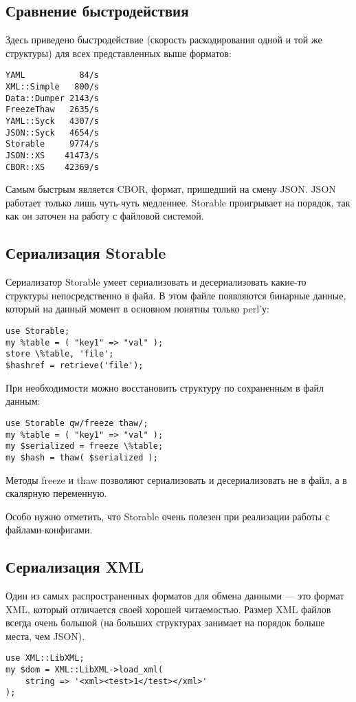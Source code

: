\subsection{Сравнение быстродействия}
Здесь приведено быстродействие (скорость раскодирования одной и той же структуры) для всех представленных выше форматов:
\begin{verbatim}
YAML           84/s
XML::Simple   800/s
Data::Dumper 2143/s
FreezeThaw   2635/s
YAML::Syck   4307/s
JSON::Syck   4654/s
Storable     9774/s
JSON::XS    41473/s
CBOR::XS    42369/s
\end{verbatim}
Самым быстрым является CBOR, формат, пришедший на смену JSON. JSON работает только лишь чуть-чуть медленнее. Storable проигрывает на порядок, так как он заточен на работу с файловой системой.

\subsection{Сериализация Storable}
Сериализатор Storable умеет сериализовать и десериализовать какие-то структуры непосредственно в файл. В этом файле появляются бинарные данные, который на данный момент в основном понятны только perl'у:
\begin{verbatim}
use Storable;
my %table = ( "key1" => "val" );
store \%table, 'file';
$hashref = retrieve('file');
\end{verbatim}
При необходимости можно восстановить структуру по сохраненным в файл данным:
\begin{verbatim}
use Storable qw/freeze thaw/;
my %table = ( "key1" => "val" );
my $serialized = freeze \%table;
my $hash = thaw( $serialized );
\end{verbatim}
Методы freeze и thaw позволяют сериализовать и десериализовать не в файл, а в скалярную переменную.

Особо нужно отметить, что Storable очень полезен при реализации работы с файлами-конфигами.

\subsection{Сериализация XML}
Один из самых распространенных форматов для обмена данными --- это формат XML, который отличается своей хорошей читаемостью. Размер XML файлов всегда очень большой (на больших структурах занимает на порядок больше места, чем JSON).
\begin{verbatim}
use XML::LibXML;
my $dom = XML::LibXML->load_xml(
    string => '<xml><test>1</test></xml>'
);
\end{verbatim}

